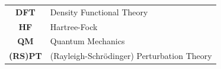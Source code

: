 \begin{tabular}{cp{}}
  \textbf{DFT}            & Density Functional Theory \\
  \textbf{HF}             & Hartree-Fock \\
  \textbf{QM}		        & Quantum Mechanics \\
  \textbf{(RS)PT}		    & (Rayleigh-Schr{\"o}dinger) Perturbation Theory \\
\end{tabular}\\